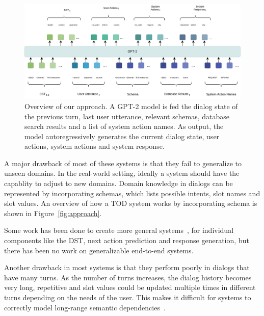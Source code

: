 \begin{figure}
    \centering
    \includegraphics[width=\linewidth]{assets/our_model.png}
    \caption{
        Overview of our approach. A GPT-2 model is fed the dialog state of the previous turn, last user utterance, relevant schemas, database search results and a list of system action names.
        As output, the model autoregressively generates the current dialog state, user actions, system actions and system response.
    }
    \label{fig:our_model}
\end{figure}



A major drawback of most of these systems is that they fail to generalize to unseen domains. In the real-world setting, ideally a system
should have the capablity to adjust to new domains. Domain knowledge in dialogs can be represented by incorporating schemas, which
lists possible intents, slot names and slot values. An overview of how a TOD system works by incorporating schema is shown in Figure~\ref{fig:approach}.

Some work has been done to create more general systems~\cite{Feng2020ASA,Lee2021DialogueST,Noroozi2020AFA,Mosig2020STARAS,Mehri2021SchemaGuidedPF},
for individual components like the DST, next action prediction and response generation, but there has been no work on generalizable end-to-end systems.

Another drawback in most systems is that they perform poorly in dialogs that have many turns. As the number of turns increases,
the dialog history becomes very long, repetitive and slot values could be updated multiple times in different turns depending on the needs of the user.
This makes it difficult for systems to correctly model long-range semantic dependencies~\cite{sun2022mars}.

